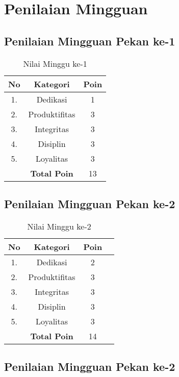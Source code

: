 \section{Penilaian Mingguan}

\subsection{Penilaian Mingguan Pekan ke-1}

\begin{table}[htp]
\centering
\caption{Nilai Minggu ke-1}
\label{tab:nm01}
\begin{tabular}{|c|c|c|}
\hline
\textbf{No} & \textbf{Kategori} & \textbf{Poin} \\ \hline
1. & Dedikasi & 1 \\ \hline
2. & Produktifitas & 3 \\ \hline
3. & Integritas & 3 \\ \hline
4. & Disiplin & 3 \\ \hline
5. & Loyalitas & 3 \\ \hline
 & \textbf{Total Poin} & 13 \\ \hline
\end{tabular}
\end{table}

\subsection{Penilaian Mingguan Pekan ke-2}

\begin{table}[htp]
\centering
\caption{Nilai Minggu ke-2}
\label{tab:nm02}
\begin{tabular}{|c|c|c|p{\textwidth}|}
\hline
\textbf{No} & \textbf{Kategori} & \textbf{Poin} \\ \hline
1. & Dedikasi & 2 \\ \hline
2. & Produktifitas & 3 \\ \hline
3. & Integritas & 3 \\ \hline
4. & Disiplin & 3 \\ \hline
5. & Loyalitas & 3 \\ \hline
 & \textbf{Total Poin} & 14 \\ \hline
\end{tabular}
\end{table}

\subsection{Penilaian Mingguan Pekan ke-2}

